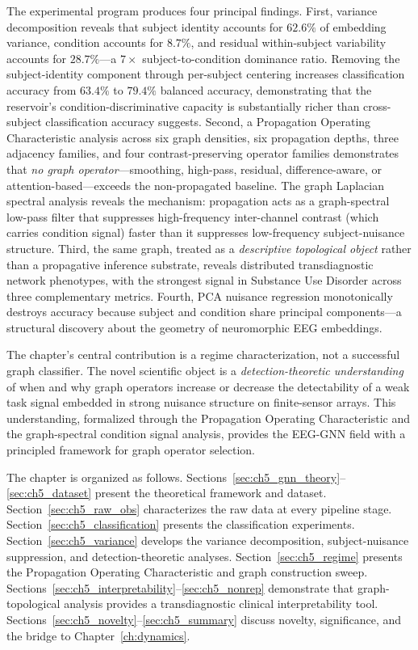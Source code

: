 The experimental program produces four principal findings. First, variance decomposition reveals that subject identity accounts for $62.6\%$ of embedding variance, condition accounts for $8.7\%$, and residual within-subject variability accounts for $28.7\%$---a $7\times$ subject-to-condition dominance ratio. Removing the subject-identity component through per-subject centering increases classification accuracy from $63.4\%$ to $79.4\%$ balanced accuracy, demonstrating that the reservoir's condition-discriminative capacity is substantially richer than cross-subject classification accuracy suggests. Second, a Propagation Operating Characteristic analysis across six graph densities, six propagation depths, three adjacency families, and four contrast-preserving operator families demonstrates that \emph{no graph operator}---smoothing, high-pass, residual, difference-aware, or attention-based---exceeds the non-propagated baseline. The graph Laplacian spectral analysis reveals the mechanism: propagation acts as a graph-spectral low-pass filter that suppresses high-frequency inter-channel contrast (which carries condition signal) faster than it suppresses low-frequency subject-nuisance structure. Third, the same graph, treated as a \emph{descriptive topological object} rather than a propagative inference substrate, reveals distributed transdiagnostic network phenotypes, with the strongest signal in Substance Use Disorder across three complementary metrics. Fourth, PCA nuisance regression monotonically destroys accuracy because subject and condition share principal components---a structural discovery about the geometry of neuromorphic EEG embeddings.

The chapter's central contribution is a regime characterization, not a successful graph classifier. The novel scientific object is a \emph{detection-theoretic understanding} of when and why graph operators increase or decrease the detectability of a weak task signal embedded in strong nuisance structure on finite-sensor arrays. This understanding, formalized through the Propagation Operating Characteristic and the graph-spectral condition signal analysis, provides the EEG-GNN field with a principled framework for graph operator selection.

The chapter is organized as follows. Sections~\ref{sec:ch5_gnn_theory}--\ref{sec:ch5_dataset} present the theoretical framework and dataset. Section~\ref{sec:ch5_raw_obs} characterizes the raw data at every pipeline stage. Section~\ref{sec:ch5_classification} presents the classification experiments. Section~\ref{sec:ch5_variance} develops the variance decomposition, subject-nuisance suppression, and detection-theoretic analyses. Section~\ref{sec:ch5_regime} presents the Propagation Operating Characteristic and graph construction sweep. Sections~\ref{sec:ch5_interpretability}--\ref{sec:ch5_nonrep} demonstrate that graph-topological analysis provides a transdiagnostic clinical interpretability tool. Sections~\ref{sec:ch5_novelty}--\ref{sec:ch5_summary} discuss novelty, significance, and the bridge to Chapter~\ref{ch:dynamics}.


